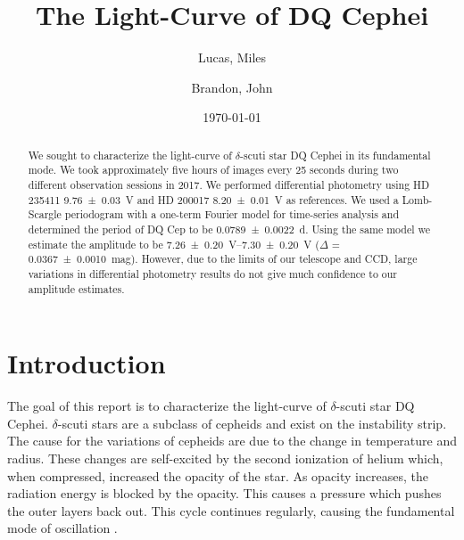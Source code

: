 \documentclass[%
aip,
jmp,
reprint,
floatfix,
nofootinbib
]{revtex4-1}
\begin{document}
	
	\title[Light-Curve of DQ Cephei]{The Light-Curve of DQ Cephei}
	
	\author{Lucas, Miles}
	\author{Brandon, John}
	
	\date{\today}
	
	

	\begin{abstract}
	We sought to characterize the light-curve of $\delta$-scuti star DQ Cephei in its fundamental mode. We took approximately five hours of images every 25 seconds during two different observation sessions in 2017. We performed differential photometry using HD 235411 \SI{9.76\pm.03}{V} and HD 200017 \SI{8.20\pm.01}{V} as references. We used a Lomb-Scargle periodogram with a one-term Fourier model for time-series analysis and determined the period of DQ Cep to be \SI{0.0789\pm.0022}{\day}. Using the same model we estimate the amplitude to be \SIrange{7.26\pm.20}{7.30\pm.20}{V} ($\Delta$ = \SI{.0367\pm.0010}{mag}). However, due to the limits of our telescope and CCD, large variations in differential photometry results do not give much confidence to our amplitude estimates. 
		
	\end{abstract}
	
	\maketitle
	

	\section{Introduction}
	
	The goal of this report is to characterize the light-curve of $\delta$-scuti star DQ Cephei. $\delta$-scuti stars are a subclass of cepheids and exist on the instability strip. The cause for the variations of cepheids are due to the change in temperature and radius. These changes are self-excited by the second ionization of helium \citep{1963ApJ...138..487C} which, when compressed, increased the opacity of the star. As opacity increases, the radiation energy is blocked by the opacity. This causes a pressure which pushes the outer layers back out. This cycle continues regularly, causing the fundamental mode of oscillation \citep{1935PASP...47..232F}. 
	
\end{document}
